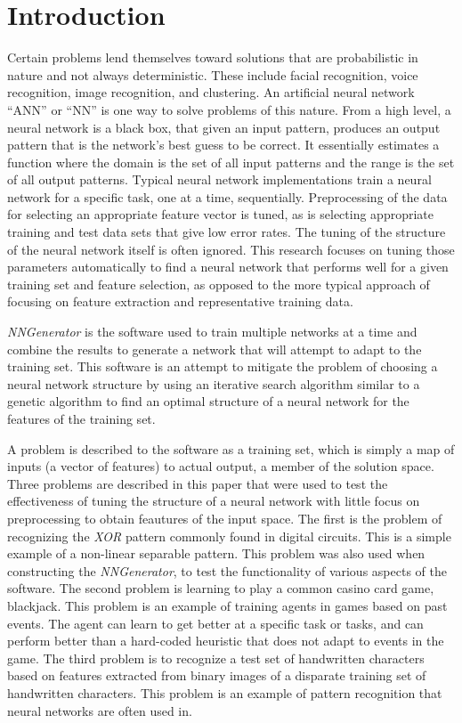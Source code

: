 \chapter[Introduction]{Introduction}
Certain problems lend themselves toward solutions that are probabilistic in nature and not always deterministic.
These include facial recognition, voice recognition, image recognition, and clustering. 
An artificial neural network ``ANN'' or ``NN'' is one way to solve problems of this nature. 
From a high level, a neural network is a black box, that given an input pattern, produces an output pattern that is the network's best guess to be correct. 
It essentially estimates a function where the domain is the set of all input patterns and the range is the set of all output patterns. 
Typical neural network implementations train a neural network for a specific task, one at a time, sequentially. 
Preprocessing of the data for selecting an appropriate feature vector is tuned, as is selecting appropriate training and test data sets that give low error rates. 
The tuning of the structure of the neural network itself is often ignored. 
This research focuses on tuning those parameters automatically to find a neural network that performs well for a given training set and feature selection, as opposed to the more typical approach of focusing on feature extraction and representative training data.

{\em NNGenerator} is the software used to train multiple networks at a time and combine the results to generate a network that will attempt to adapt to the training set. 
This software is an attempt to mitigate the problem of choosing a neural network structure by using an iterative search algorithm similar to a genetic algorithm to find an optimal structure of a neural network for the features of the training set. 

A problem is described to the software as a training set, which is simply a map of inputs (a vector of features) to actual output, a member of the solution space.
Three problems are described in this paper that were used to test the effectiveness of tuning the structure of a neural network with little focus on preprocessing to obtain feautures of the input space. 
The first is the problem of recognizing the {\it XOR} pattern commonly found in digital circuits. 
This is a simple example of a non-linear separable pattern. 
This problem was also used when constructing the {\em NNGenerator}, to test the functionality of various aspects of the software. 
The second problem is learning to play a common casino card game, blackjack. 
This problem is an example of training agents in games based on past events. 
The agent can learn to get better at a specific task or tasks, and can perform better than a hard-coded heuristic that does not adapt to events in the game. 
The third problem is to recognize a test set of handwritten characters based on features extracted from binary images of a disparate training set of handwritten characters. 
This problem is an example of pattern recognition that neural networks are often used in.

